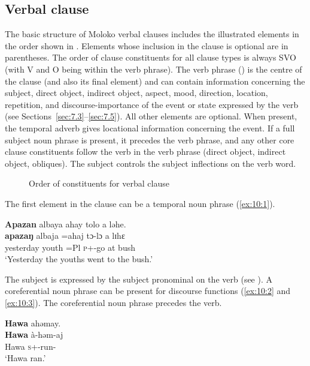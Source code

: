 \subsection{Verbal clause}\label{sec:10.1.1}
\hypertarget{RefHeading1212861525720847}{}
The basic structure of Moloko verbal clauses includes the illustrated elements in the order shown in . Elements whose inclusion in the clause is optional are in parentheses. The order of clause constituents for all clause types is always SVO (with V and O being within the verb phrase). The verb phrase () is the centre of the clause (and also its final element) and can contain information concerning the subject, direct object, indirect object, aspect, mood, direction, location, repetition, and discourse-importance of the event or state expressed by the verb (see Sections~\ref{sec:7.3}--\ref{sec:7.5}). All other elements are optional. When present, the temporal adverb gives locational information concerning the event. If a full subject noun phrase is present, it precedes the verb phrase, and any other core clause constituents follow the verb in the verb phrase (direct object, indirect object, obliques). The subject controls the subject inflections on the verb word. 
  
\begin{figure}
\caption{Order of constituents for verbal clause\label{fig:16}}
\end{figure}

The first element in the clause can be a temporal noun phrase (\ref{ex:10:1}).

\ea \label{ex:10:1}
\textbf{Apazan} albaya  ahay  tolo  a  ləhe.\\
\gll  \textbf{apazaŋ}  albaja    =ahaj    tɔ-lɔ    a  lɪhɛ\\
      yesterday  youth    =Pl      \textsc{p}+{\PFV}-go  at  bush\\
\glt  ‘Yesterday the youths went to the bush.’ 
\z

The subject is expressed by the subject pronominal on the verb (see ). A coreferential noun phrase can be present for discourse functions (\ref{ex:10:2} and \ref{ex:10:3}). The coreferential noun phrase precedes the verb.  

\ea \label{ex:10:2}
\textbf{Hawa}  ahəmay.\\
\gll  \textbf{Hawa}   à-həm-aj\\
      Hawa  \textsc{s}+{\PFV}-run{}-{\CL}\\
\glt  ‘Hawa ran.’
\z


